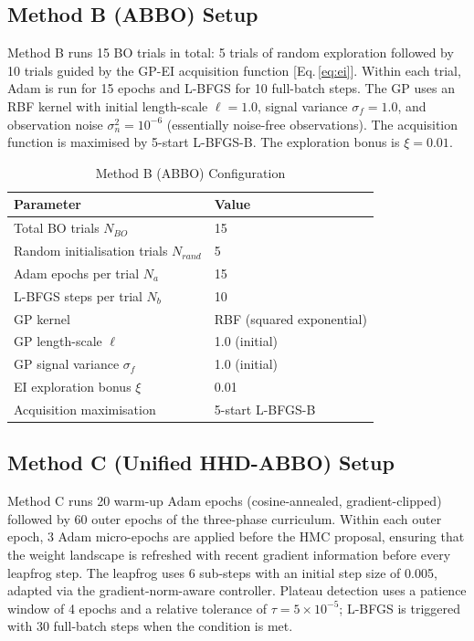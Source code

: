 \documentclass[12pt,a4paper]{article}
\begin{document}
\subsection{Method B (ABBO) Setup}

Method B runs 15 BO trials in total: 5 trials of random exploration
followed by 10 trials guided by the GP-EI acquisition function
[Eq.\,\eqref{eq:ei}].  Within each trial, Adam is run for 15 epochs
and L-BFGS for 10 full-batch steps.  The GP uses an RBF kernel with
initial length-scale $\ell = 1.0$, signal variance $\sigma_f = 1.0$,
and observation noise $\sigma_n^2 = 10^{-6}$ (essentially noise-free
observations).  The acquisition function is maximised by 5-start
L-BFGS-B.  The exploration bonus is $\xi = 0.01$.

\begin{table}[tb]
\centering
\caption{Method B (ABBO) Configuration}
\label{tab:setup_b}
\renewcommand{\arraystretch}{1.2}
\begin{tabular}{ll}
\toprule
Parameter & Value \\
\midrule
Total BO trials $N_{BO}$          & 15 \\
Random initialisation trials $N_{rand}$ & 5 \\
Adam epochs per trial $N_a$       & 15 \\
L-BFGS steps per trial $N_b$      & 10 \\
GP kernel                         & RBF (squared exponential) \\
GP length-scale $\ell$            & 1.0 (initial) \\
GP signal variance $\sigma_f$     & 1.0 (initial) \\
EI exploration bonus $\xi$        & 0.01 \\
Acquisition maximisation          & 5-start L-BFGS-B \\
\bottomrule
\end{tabular}
\end{table}

\subsection{Method C (Unified HHD-ABBO) Setup}

Method C runs 20 warm-up Adam epochs (cosine-annealed, gradient-clipped)
followed by 60 outer epochs of the three-phase curriculum.  Within each
outer epoch, 3 Adam micro-epochs are applied before the HMC proposal,
ensuring that the weight landscape is refreshed with recent gradient
information before every leapfrog step.  The leapfrog uses 6 sub-steps
with an initial step size of 0.005, adapted via the gradient-norm-aware
controller.  Plateau detection uses a patience window of 4 epochs and a
relative tolerance of $\tau = 5 \times 10^{-5}$; L-BFGS is triggered
with 30 full-batch steps when the condition is met.
\end{document}
